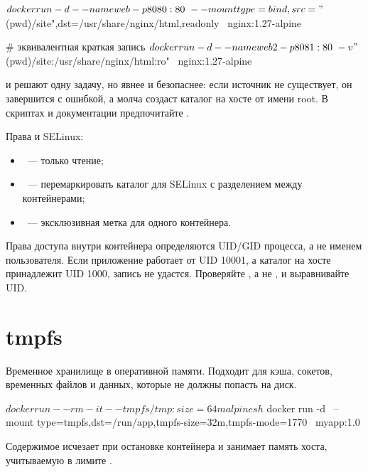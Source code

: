 \begin{code}[language=bash]
$ docker run -d --name web -p 8080:80 \
    --mount type=bind,src="$(pwd)/site",dst=/usr/share/nginx/html,readonly \
    nginx:1.27-alpine

# эквивалентная краткая запись
$ docker run -d --name web2 -p 8081:80 \
    -v "$(pwd)/site:/usr/share/nginx/html:ro" \
    nginx:1.27-alpine
\end{code}

\begin{notebox}
 и  решают одну задачу, но 
явнее и безопаснее: если источник не существует, он завершится
с ошибкой, а  молча создаст каталог на хосте от имени root.
В скриптах и документации предпочитайте .
\end{notebox}

Права и SELinux:

\begin{itemize}
  \item {}~--- только чтение;
  \item \cmd{:z}~--- перемаркировать каталог для SELinux с разделением
        между контейнерами;
  \item \cmd{:Z}~--- эксклюзивная метка для одного контейнера.
\end{itemize}

\begin{warnbox}
Права доступа внутри контейнера определяются UID/GID процесса,
а не именем пользователя. Если приложение работает от UID 10001,
а каталог на хосте принадлежит UID 1000, запись не удастся.
Проверяйте , а не , и выравнивайте UID.
\end{warnbox}

\section{tmpfs}

Временное хранилище в оперативной памяти. Подходит для кэша, сокетов,
временных файлов и данных, которые не должны попасть на диск.

\begin{code}[language=bash]
$ docker run --rm -it --tmpfs /tmp:size=64m alpine sh
$ docker run -d \
    --mount type=tmpfs,dst=/run/app,tmpfs-size=32m,tmpfs-mode=1770 \
    myapp:1.0
\end{code}

Содержимое \cmd{tmpfs} исчезает при остановке контейнера и занимает
память хоста, учитываемую в лимите .

